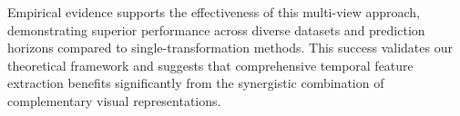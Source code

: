 Empirical evidence supports the effectiveness of this multi-view approach, demonstrating superior performance across diverse datasets and prediction horizons compared to single-transformation methods. This success validates our theoretical framework and suggests that comprehensive temporal feature extraction benefits significantly from the synergistic combination of complementary visual representations.